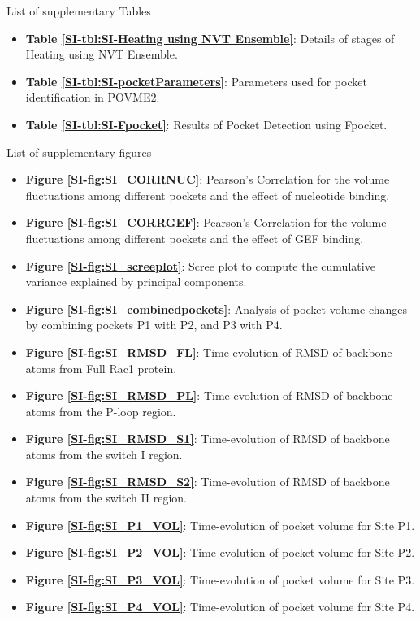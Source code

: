 \documentclass[12pt,a4paper]{achemso}
\begin{document}
\begin{suppinfo}

List of supplementary Tables
\begin{itemize}
 \item \textbf{Table \ref{SI-tbl:SI-Heating using NVT Ensemble}}: Details of stages of Heating using NVT Ensemble.
 \item \textbf{Table \ref{SI-tbl:SI-pocketParameters}}: Parameters used for pocket identification in POVME2.
 \item \textbf{Table \ref{SI-tbl:SI-Fpocket}}: Results of Pocket Detection using Fpocket.
\end{itemize}

List of supplementary figures
\begin{itemize}
    \item \textbf{Figure \ref{SI-fig:SI_CORRNUC}}: Pearson's Correlation for the volume fluctuations among different pockets and the effect of nucleotide binding.
    \item \textbf{Figure \ref{SI-fig:SI_CORRGEF}}: Pearson's Correlation for the volume fluctuations among different pockets and the effect of GEF binding.
    \item \textbf{Figure \ref{SI-fig:SI_screeplot}}: Scree plot to compute the cumulative variance explained by principal components.
    \item \textbf{Figure \ref{SI-fig:SI_combinedpockets}}: Analysis of pocket volume changes by combining pockets P1 with P2, and P3 with P4.
    \item \textbf{Figure \ref{SI-fig:SI_RMSD_FL}}: Time-evolution of RMSD of backbone atoms from Full Rac1 protein.
    \item \textbf{Figure \ref{SI-fig:SI_RMSD_PL}}: Time-evolution of RMSD of backbone atoms from the P-loop region.
    \item \textbf{Figure \ref{SI-fig:SI_RMSD_S1}}: Time-evolution of RMSD of backbone atoms from the switch I region.
    \item \textbf{Figure \ref{SI-fig:SI_RMSD_S2}}: Time-evolution of RMSD of backbone atoms from the switch II region.
    \item \textbf{Figure \ref{SI-fig:SI_P1_VOL}}: Time-evolution of pocket volume for Site P1.
    \item \textbf{Figure \ref{SI-fig:SI_P2_VOL}}: Time-evolution of pocket volume for Site P2.
    \item \textbf{Figure \ref{SI-fig:SI_P3_VOL}}: Time-evolution of pocket volume for Site P3.
    \item \textbf{Figure \ref{SI-fig:SI_P4_VOL}}: Time-evolution of pocket volume for Site P4.

\end{itemize}
\end{suppinfo}
\end{document}
